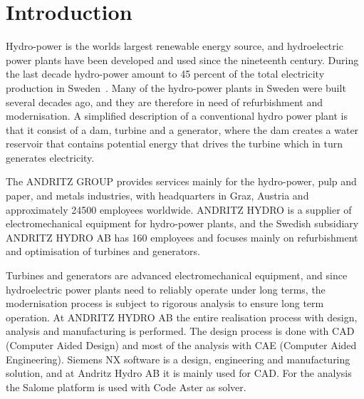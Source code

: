 
\chapter{Introduction}
\label{cha:introdution}

Hydro-power is the worlds largest renewable energy source, and hydroelectric power plants have been developed and used since the nineteenth century. During the last decade hydro-power amount to 45 percent of the total electricity production in Sweden~\cite{scb}. Many of the hydro-power plants in Sweden were built several decades ago, and they are therefore in need of refurbishment and modernisation. A simplified description of a conventional hydro power plant is that it consist of a dam, turbine and a generator, where the dam creates a water reservoir that contains potential energy that drives the turbine which in turn generates electricity.

The ANDRITZ GROUP provides services mainly for the hydro-power, pulp and paper, and metals industries, with headquarters in Graz, Austria and approximately \num{24500} employees worldwide. ANDRITZ HYDRO is a supplier of electromechanical equipment for hydro-power plants, and the Swedish subsidiary ANDRITZ HYDRO AB has 160 employees and focuses mainly on refurbishment and optimisation of turbines and generators.

Turbines and generators are advanced electromechanical equipment, and since hydroelectric power plants need to reliably operate under long terms, the modernisation process is subject to rigorous analysis to ensure long term operation. At ANDRITZ HYDRO AB the entire realisation process with design, analysis and manufacturing is performed. 
The design process is done with CAD (Computer Aided Design) and most of the analysis with CAE (Computer Aided Engineering). Siemens NX software is a design, engineering and manufacturing solution, and at Andritz Hydro AB it is mainly used for CAD. For the analysis the Salome platform is used with Code Aster as solver.

